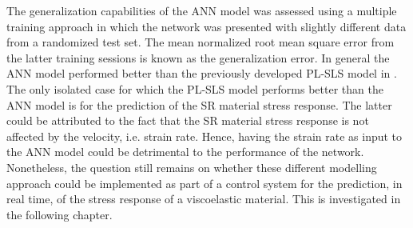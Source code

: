 The generalization capabilities of the ANN model was assessed using a multiple training approach in which the network was presented with slightly different data from a randomized test set. The mean normalized root mean square error from the latter training sessions is known as the generalization error. In general the ANN model performed better than the previously developed PL-SLS model in . The only isolated case for which the PL-SLS model performs better than the ANN model is for the prediction of the SR material stress response. The latter could be attributed to the fact that the SR material stress response is not affected by the velocity, i.e. strain rate. Hence, having the strain rate as input to the ANN model could be detrimental to the performance of the network. Nonetheless, the question still remains on whether these different modelling approach could be implemented as part of a control system for the prediction, in real time, of the stress response of a viscoelastic material. This is investigated in the following chapter.